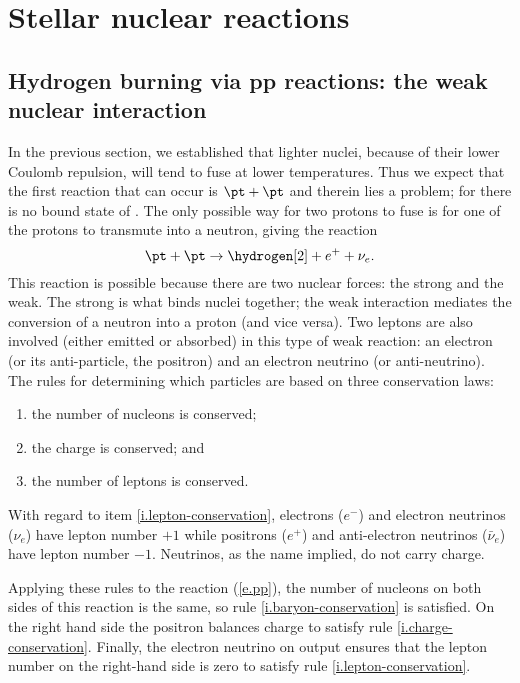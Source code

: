 \section{Stellar nuclear reactions}

\subsection{Hydrogen burning via pp reactions: the weak nuclear interaction}

In the previous section, we established that lighter nuclei, because of their lower Coulomb repulsion, will tend to fuse at lower temperatures. Thus we expect that the first reaction that can occur is $\pt+\pt$ and therein lies a problem; for there is no bound state of \helium[2]. The only possible way for two protons to fuse is for one of the protons to transmute into a neutron, giving the reaction
\begin{equation}\label{e.pp}
	\pt + \pt \to \hydrogen[2] + e^{+} + \nu_{e}.
\end{equation}
This reaction is possible because there are two nuclear forces: the strong and the weak. The strong is what binds nuclei together; the weak interaction mediates the conversion of a neutron into a proton (and vice versa). Two leptons are also involved (either emitted or absorbed) in this type of weak reaction: an electron (or its anti-particle, the positron) and an electron neutrino (or anti-neutrino). The rules for determining which particles are based on three conservation laws:
\begin{enumerate}
\item\label{i.baryon-conservation} the number of nucleons is conserved;
\item\label{i.charge-conservation} the charge is conserved; and
\item\label{i.lepton-conservation} the number of leptons is conserved.
\end{enumerate}
With regard to item \ref{i.lepton-conservation}, electrons ($e^{-}$) and electron neutrinos ($\nu_{e}$) have lepton number $+1$ while positrons ($e^{+}$) and anti-electron neutrinos ($\bar{\nu}_{e}$) have lepton number $-1$. Neutrinos, as the name implied, do not carry charge.

Applying these rules to the reaction (\ref{e.pp}), the number of nucleons on both sides of this reaction is the same, so rule \ref{i.baryon-conservation} is satisfied. On the right hand side the positron balances charge to satisfy rule \ref{i.charge-conservation}. Finally, the electron neutrino on output ensures that the lepton number on the right-hand side is zero to satisfy rule \ref{i.lepton-conservation}.

